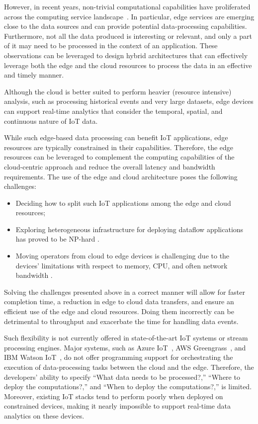 However, in recent years, non-trivial computational capabilities have proliferated across the computing service landscape~\cite{continuum}. In particular, edge services are emerging close to the data sources and can provide potential data-processing capabilities\cite{dastjerdi2016fog,bonomi2014fog}. Furthermore, not all the data produced is interesting or relevant, and only a part of it may need to be processed in the context of an application. These observations can be leveraged to design hybrid architectures that can effectively leverage both the edge and the cloud resources to process the data in an effective and timely manner\cite{ahmed2017role, satyanarayanan2015edge}.

Although the cloud is better suited to perform heavier (resource intensive) analysis, such as processing historical events and very large datasets, edge devices can support real-time analytics that consider the temporal, spatial, and continuous nature of IoT data. 

While such edge-based data processing can benefit IoT applications, edge resources are typically constrained in their capabilities. Therefore, the edge resources can be leveraged to complement the computing capabilities of the cloud-centric approach and reduce the overall latency and bandwidth requirements. The use of the edge and cloud architecture poses the following challenges: 

\begin{itemize}
\item Deciding how to split such IoT applications among the edge and cloud resources;

\item Exploring heterogeneous infrastructure for deploying dataflow applications has proved to be NP-hard \cite{Benoit:2013}.
 
\item Moving operators from cloud to edge devices is challenging due to the devices' limitations with respect to memory, CPU, and often network bandwidth \cite{dias:2018:survey}.
\end{itemize}

Solving the challenges presented above in a correct manner will allow for faster completion time, a reduction in edge to cloud data transfers, and ensure an efficient use of the edge and cloud resources. Doing them incorrectly can be detrimental to throughput and exacerbate the time for handling data events.
 
Such flexibility is not currently offered in state-of-the-art IoT systems or stream processing engines. Major systems, such as Azure IoT~\cite{azure}, AWS Greengrass~\cite{amazon}, and IBM Watson IoT~\cite{IBM}, do not offer programming support for orchestrating the execution of data-processing tasks between the cloud and the edge. Therefore, the developers' ability to specify ``What data needs to be processed?,'' ``Where to deploy the computations?,'' and ``When to deploy the computations?,'' is limited. Moreover, existing IoT stacks tend to perform poorly when deployed on constrained devices, making it nearly impossible to support real-time data analytics on these devices.


